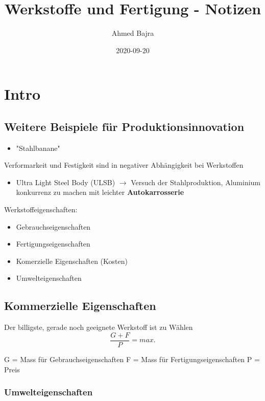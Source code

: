 \documentclass{article}
\title{Werkstoffe und Fertigung \rom{1} - Notizen}
\author{Ahmed Bajra}
\date{2020-09-20}
\begin{document}
\maketitle

\section{Intro}
\subsection{Weitere Beispiele für Produktionsinnovation}
\begin{itemize}
    \item "Stahlbanane"
\end{itemize} 

Verformarkeit und Festigkeit sind in negativer Abhängigkeit bei Werkstoffen

\begin{itemize}
    \item Ultra Light Steel Body (ULSB) $\rightarrow$ Versuch der Stahlproduktion, Aluminium konkurrenz zu machen mit leichter \textbf{Autokarrosserie}
\end{itemize}

Werkstoffeigenschaften:
\begin{itemize}
    \item Gebrauchseigenschaften
    \item Fertigungseigenschaften
    \item Komerzielle Eigenschaften (Kosten)
    \item Umwelteigenschaften
\end{itemize}

\subsection{Kommerzielle Eigenschaften}

Der billigste, gerade noch geeignete Werkstoff ist zu Wählen
\[
    \frac{G + F}{P}=max.
\]

G = Mass für Gebrauchseigenschaften
F = Mass für Fertigungseigenschaften
P = Preis

\newpage

\subsubsection{Umwelteigenschaften}
\end{document}
